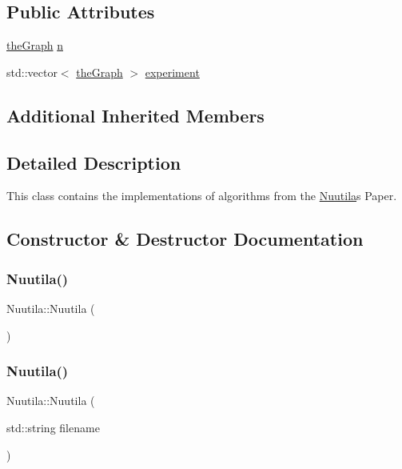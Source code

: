 \subsection*{Public Attributes}
\begin{DoxyCompactItemize}
\item 
\hyperlink{class_graph_component_a982e0748a6e1b8dc74986f5f8b3dca5c}{the\+Graph} \hyperlink{class_nuutila_a1409929fa0f38709497f8bdb012af71c}{n}
\item 
std\+::vector$<$ \hyperlink{class_graph_component_a982e0748a6e1b8dc74986f5f8b3dca5c}{the\+Graph} $>$ \hyperlink{class_nuutila_a70e8a910cc4050d246db2540bd1e36c5}{experiment}
\end{DoxyCompactItemize}
\subsection*{Additional Inherited Members}


\subsection{Detailed Description}
This class contains the implementations of algorithms from the \hyperlink{class_nuutila}{Nuutila}\textquotesingle{}s Paper. 

\subsection{Constructor \& Destructor Documentation}
\mbox{\label{class_nuutila_ab1ae0281145f693a922f5122d27cc23b}} 
\subsubsection{\texorpdfstring{Nuutila()}{Nuutila()}\hspace{0.1cm}{\footnotesize\ttfamily [1/2]}}
{\footnotesize\ttfamily Nuutila\+::\+Nuutila (\begin{DoxyParamCaption}{ }\end{DoxyParamCaption})\hspace{0.3cm}{\ttfamily [inline]}}

\mbox{\label{class_nuutila_a00bb9066a5a1c9fb03e25481f4f47a0c}} 
\subsubsection{\texorpdfstring{Nuutila()}{Nuutila()}\hspace{0.1cm}{\footnotesize\ttfamily [2/2]}}
{\footnotesize\ttfamily Nuutila\+::\+Nuutila (\begin{DoxyParamCaption}\item[{std\+::string}]{filename }\end{DoxyParamCaption})\hspace{0.3cm}{\ttfamily [inline]}}



